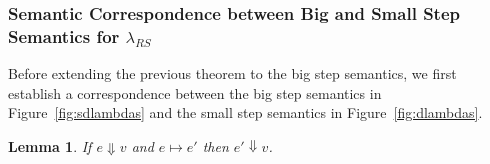 \documentclass[11pt,leqno]{article}
\newtheorem{trlem}[tr]{Lemma}
\theoremstyle{definition}
\newcommand{\lambdas}{\lambda_{RS}}
\newcommand{\sreduces}{ \Downarrow }
\begin{document}
\subsubsection{Semantic Correspondence between Big and Small Step Semantics for $\lambdas$}

Before extending the previous theorem to the big step semantics, we first establish a correspondence between
the big step semantics in Figure~\ref{fig:sdlambdas} and the small step semantics in Figure~\ref{fig:dlambdas}.


\begin{trlem} \label{lem:inductive}
If $e \sreduces v$ and $e \mapsto e'$ then $e' \sreduces v$. 
\end{trlem}
\end{document}
